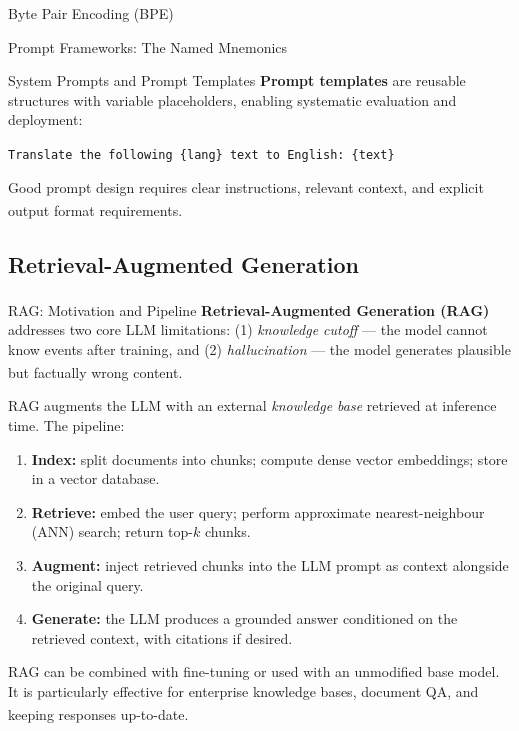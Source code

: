 \begin{v3topic}{Byte Pair Encoding (BPE)}
\begin{v3topic}{Prompt Frameworks: The Named Mnemonics}
\begin{v3topic}{System Prompts and Prompt Templates}
    \textbf{Prompt templates} are reusable structures with variable placeholders,
    enabling systematic evaluation and deployment:
    \begin{center}
        \texttt{Translate the following \{lang\} text to English: \{text\}}
    \end{center}

    Good prompt design requires clear instructions, relevant context, and explicit output
    format
    requirements.\textsuperscript{\cite[][p.~70]{farrisHowLargeLanguage2025}}

\end{v3topic}

\subsection{Retrieval-Augmented Generation}


\begin{v3topic}{RAG: Motivation and Pipeline}
    \textbf{Retrieval-Augmented Generation (RAG)}\textsuperscript{\cite{lewisRetrievalAugmentedGeneration2020}} addresses two core LLM limitations:
    (1) \emph{knowledge cutoff} --- the model cannot know events after training, and
    (2) \emph{hallucination} --- the model generates plausible but factually wrong
    content.\textsuperscript{\cite[][p.~82]{farrisHowLargeLanguage2025}}

    RAG augments the LLM with an external \emph{knowledge base} retrieved at inference
    time. The pipeline:

    \begin{enumerate}
        \item \textbf{Index:} split documents into chunks; compute dense vector
              embeddings; store in a vector database.
        \item \textbf{Retrieve:} embed the user query; perform approximate
              nearest-neighbour (ANN) search; return top-$k$ chunks.
        \item \textbf{Augment:} inject retrieved chunks into the LLM prompt as context
              alongside the original query.
        \item \textbf{Generate:} the LLM produces a grounded answer conditioned on the
              retrieved context, with citations if desired.
    \end{enumerate}

    RAG can be combined with fine-tuning or used with an unmodified base model. It is
    particularly effective for enterprise knowledge bases, document QA, and keeping
    responses up-to-date.\textsuperscript{\cite[][p.~83]{farrisHowLargeLanguage2025}}


\end{v3topic}
\end{v3topic}
\end{v3topic}
